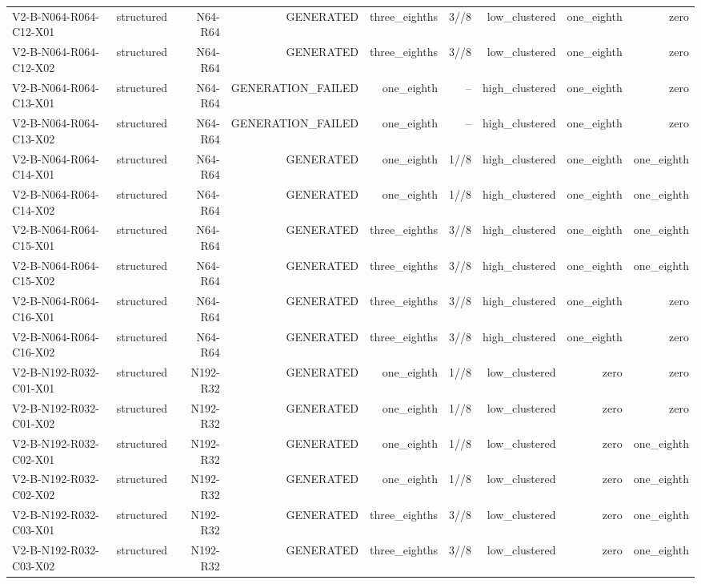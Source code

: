 {\begin{longtable}{lrrrrrrrr}
V2-B-N064-R064-C12-X01 & structured & N64-R64 & GENERATED & three\_eighths & 3//8 & low\_clustered & one\_eighth & zero \\
V2-B-N064-R064-C12-X02 & structured & N64-R64 & GENERATED & three\_eighths & 3//8 & low\_clustered & one\_eighth & zero \\
V2-B-N064-R064-C13-X01 & structured & N64-R64 & GENERATION\_FAILED & one\_eighth & -- & high\_clustered & one\_eighth & zero \\
V2-B-N064-R064-C13-X02 & structured & N64-R64 & GENERATION\_FAILED & one\_eighth & -- & high\_clustered & one\_eighth & zero \\
V2-B-N064-R064-C14-X01 & structured & N64-R64 & GENERATED & one\_eighth & 1//8 & high\_clustered & one\_eighth & one\_eighth \\
V2-B-N064-R064-C14-X02 & structured & N64-R64 & GENERATED & one\_eighth & 1//8 & high\_clustered & one\_eighth & one\_eighth \\
V2-B-N064-R064-C15-X01 & structured & N64-R64 & GENERATED & three\_eighths & 3//8 & high\_clustered & one\_eighth & one\_eighth \\
V2-B-N064-R064-C15-X02 & structured & N64-R64 & GENERATED & three\_eighths & 3//8 & high\_clustered & one\_eighth & one\_eighth \\
V2-B-N064-R064-C16-X01 & structured & N64-R64 & GENERATED & three\_eighths & 3//8 & high\_clustered & one\_eighth & zero \\
V2-B-N064-R064-C16-X02 & structured & N64-R64 & GENERATED & three\_eighths & 3//8 & high\_clustered & one\_eighth & zero \\
V2-B-N192-R032-C01-X01 & structured & N192-R32 & GENERATED & one\_eighth & 1//8 & low\_clustered & zero & zero \\
V2-B-N192-R032-C01-X02 & structured & N192-R32 & GENERATED & one\_eighth & 1//8 & low\_clustered & zero & zero \\
V2-B-N192-R032-C02-X01 & structured & N192-R32 & GENERATED & one\_eighth & 1//8 & low\_clustered & zero & one\_eighth \\
V2-B-N192-R032-C02-X02 & structured & N192-R32 & GENERATED & one\_eighth & 1//8 & low\_clustered & zero & one\_eighth \\
V2-B-N192-R032-C03-X01 & structured & N192-R32 & GENERATED & three\_eighths & 3//8 & low\_clustered & zero & one\_eighth \\
V2-B-N192-R032-C03-X02 & structured & N192-R32 & GENERATED & three\_eighths & 3//8 & low\_clustered & zero & one\_eighth \\

\end{longtable}}

